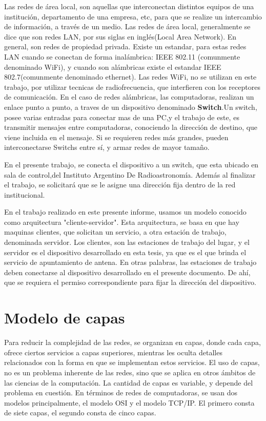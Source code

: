 Las redes de área local, son aquellas que interconectan distintos equipos de una institución, departamento de una empresa, etc, para que se realize un intercambio de información, a través de un medio. Las redes de área local, generalmente se dice que son redes LAN, por sus siglas en inglés(Local Area Network).  En general, son redes de propiedad privada. Existe un estandar, para estas redes LAN cuando se conectan de forma inalámbrica: IEEE 802.11 (comunmente denominado WiFi), y cuando son alámbricas existe el estandar IEEE 802.7(comunmente denominado ethernet). Las redes WiFi, no se utilizan en este trabajo, por utilizar tecnicas de radiofrecuencia, que interfieren con los receptores de comunicación.  
En el caso de redes alámbricas, las computadoras, realizan un enlace punto a punto, a traves de un dispositivo denominado \textbf{Switch}.Un switch, posee varias entradas para conectar mas de una PC,y el trabajo de este, es transmitir mensajes entre computadoras, conociendo la dirección de destino, que viene incluida en el mensaje. Si se requieren redes más grandes, pueden interconectarse Switchs entre sí, y armar redes de mayor tamaño. 


En el presente trabajo, se conecta el dispositivo a un switch, que esta ubicado en sala de control,del Instituto Argentino De Radioastronomía. Además al finalizar el trabajo, se solicitará que se le asigne una dirección fija dentro de la red institucional.  

En el trabajo realizado en este presente informe, usamos un modelo conocido como arquitectura "cliente-servidor". Esta arquitectura, se basa en que hay maquinas clientes, que solicitan un servicio, a otra estación de trabajo, denominada servidor. Los clientes, son las estaciones de trabajo del lugar, y el servidor es el dispositivo desarrollado en esta tesis, ya que es el que brinda el servicio de apuntamiento de antena. En otras palabras, las estaciones de trabajo deben conectarse al dispositivo desarrollado en el presente documento. De ahí, que se requiera el permiso correspondiente para fijar la dirección del dispositivo.  




\section{Modelo de capas}

Para reducir la complejidad de las redes, se organizan en capas, donde cada capa, ofrece ciertos servicios a capas superiores, mientras les oculta detalles relacionados con la forma en que se implementan estos servicios. El uso de capas, no es un problema inherente de las redes, sino que se aplica en otros ámbitos de las ciencias de la computación. La cantidad de capas es variable, y depende del problema en cuestión. En términos de redes de computadoras, se usan dos modelos principalmente, el modelo OSI y el modelo TCP/IP. El primero consta de siete capas, el segundo consta de cinco capas. 

